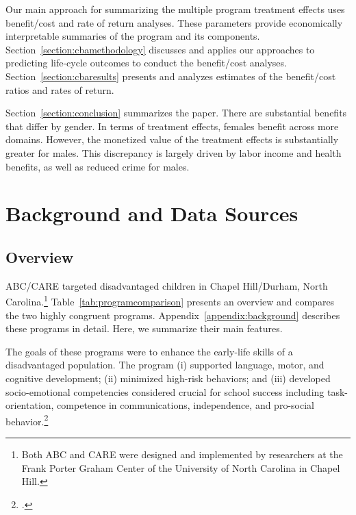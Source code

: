 Our main approach for summarizing the multiple program treatment effects uses benefit/cost and rate of return analyses. These parameters provide economically interpretable summaries of the program and its components. Section~\ref{section:cbamethodology} discusses and applies our approaches to predicting life-cycle outcomes to conduct the benefit/cost analyses. Section~\ref{section:cbaresults} presents and analyzes estimates of the benefit/cost ratios and rates of return.

Section~\ref{section:conclusion} summarizes the paper. There are substantial benefits that differ by gender. In terms of treatment effects, females benefit across more domains. However, the monetized value of the treatment effects is substantially greater for males. This discrepancy is largely driven by labor income and health benefits, as well as reduced crime for males.

\section[Background and Data Sources]{Background and Data Sources} \label{section:background}

\subsection{Overview}

ABC/CARE targeted disadvantaged children in Chapel Hill/Durham, North Carolina.\footnote{Both ABC and CARE were designed and implemented by researchers at the Frank Porter Graham Center of the University of North Carolina in Chapel Hill.} Table~\ref{tab:programcomparison} presents an overview and compares the two highly congruent programs. Appendix~\ref{appendix:background} describes these programs in detail. Here, we summarize their main features.

The goals of these programs were to enhance the early-life skills of a disadvantaged population. The program (i) supported language, motor, and cognitive development; (ii) minimized high-risk behaviors; and (iii) developed socio-emotional competencies considered crucial for school success including task-orientation, competence in communications, independence, and pro-social behavior.\footnote{\citet{Ramey_Collier_etal_1976_CarolinaAbecedarianProject, Ramey_etal_1985_Project-CARE_TiECSE, Sparling_1974_Synth_Edu_Infant_SPEECH, Wasik_Ramey_etal_1990_CD, Ramey-etal_2012-ABC}.}

